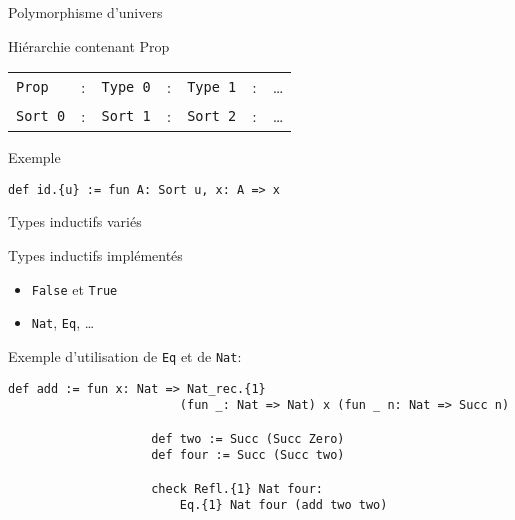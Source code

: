 \documentclass[12pt, aspectratio=169]{beamer}
\begin{document}
        \begin{frame}[fragile]{Polymorphisme d'univers}
            
            \begin{block}{Hiérarchie contenant Prop}
               
                \begin{tabular}{lclclcl}
                    \texttt{Prop} &:& \texttt{Type 0} &:& \texttt{Type 1} &:& \dots \\
                    \texttt{Sort 0} &:& \texttt{Sort 1} &:& \texttt{Sort 2} &:& \dots
                \end{tabular}
                
            \end{block}

            \vfill

            \begin{exampleblock}{Exemple}
                
                \begin{lstlisting}[language=mdln]
                    def id.{u} := fun A: Sort u, x: A => x
                \end{lstlisting}

            \end{exampleblock}

        \end{frame}

        \begin{frame}[fragile]{Types inductifs variés}
            
            \begin{exampleblock}{Types inductifs implémentés}
                
                \begin{itemize}
                    \item \lstinline{False} et \lstinline{True}
                    \item \lstinline{Nat}, \lstinline{Eq}, \dots
                \end{itemize}

            \end{exampleblock} \pause

            \begin{exampleblock}{Exemple d'utilisation de \lstinline{Eq} et de \lstinline{Nat}:}
                
                \begin{lstlisting}[language=mdln]
                    def add := fun x: Nat => Nat_rec.{1}
                        (fun _: Nat => Nat) x (fun _ n: Nat => Succ n)

                    def two := Succ (Succ Zero)
                    def four := Succ (Succ two)

                    check Refl.{1} Nat four:
                        Eq.{1} Nat four (add two two)
                \end{lstlisting}

            \end{exampleblock}

        \end{frame}
\end{document}
